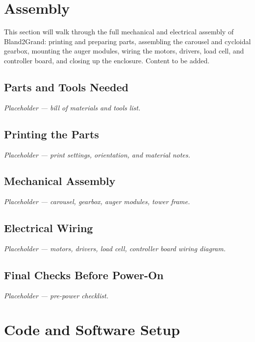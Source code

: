 \documentclass[11pt, letterpaper]{article}
\begin{document}
\section{Assembly}
\label{sec:assembly}

\begin{tcolorbox}[placeholderbox, title={Section In Progress}]
\small
This section will walk through the full mechanical and electrical assembly of Bland2Grand: printing and preparing parts, assembling the carousel and cycloidal gearbox, mounting the auger modules, wiring the motors, drivers, load cell, and controller board, and closing up the enclosure. Content to be added.
\end{tcolorbox}

\subsection{Parts and Tools Needed}
\textit{Placeholder --- bill of materials and tools list.}

\subsection{Printing the Parts}
\textit{Placeholder --- print settings, orientation, and material notes.}

\subsection{Mechanical Assembly}
\textit{Placeholder --- carousel, gearbox, auger modules, tower frame.}

\subsection{Electrical Wiring}
\textit{Placeholder --- motors, drivers, load cell, controller board wiring diagram.}

\subsection{Final Checks Before Power-On}
\textit{Placeholder --- pre-power checklist.}

\section{Code and Software Setup}
\label{sec:code-setup}
\end{document}
